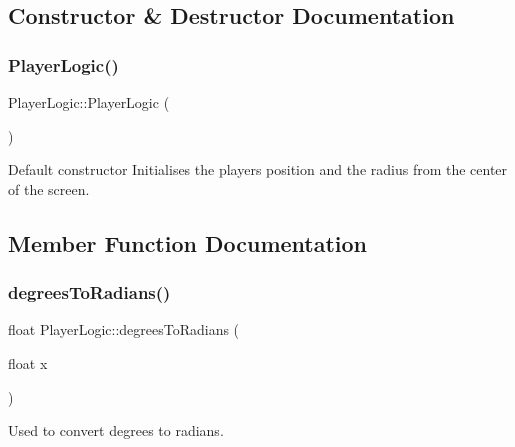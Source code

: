 \subsection{Constructor \& Destructor Documentation}
\mbox{\label{class_player_logic_aa14c9bac512df3d01ea4db0224e82405}} 
\subsubsection{\texorpdfstring{Player\+Logic()}{PlayerLogic()}}
{\footnotesize\ttfamily Player\+Logic\+::\+Player\+Logic (\begin{DoxyParamCaption}{ }\end{DoxyParamCaption})}

Default constructor Initialises the players position and the radius from the center of the screen. 

\subsection{Member Function Documentation}
\mbox{\label{class_player_logic_a425e0b7a5a4495958a41383525f059eb}} 
\subsubsection{\texorpdfstring{degrees\+To\+Radians()}{degreesToRadians()}}
{\footnotesize\ttfamily float Player\+Logic\+::degrees\+To\+Radians (\begin{DoxyParamCaption}\item[{float}]{x }\end{DoxyParamCaption})}



Used to convert degrees to radians. 


